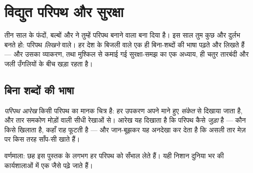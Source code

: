 \chapter{विद्युत परिपथ और सुरक्षा}\label{ch:g6:circuits-and-safety}

तीन साल के फंदों, बल्बों और  ने तुम्हें परिपथ बनाने वाला बना
दिया है। इस साल तुम कुछ और दुर्लभ बनते हो: परिपथ \emph{लिखने} वाले।
हर देश के बिजली वाले एक ही बिना-शब्दों की भाषा पढ़ते और लिखते हैं ---
और उसका व्याकरण, तथा मुश्किल से कमाई गई सुरक्षा-समझ का एक अध्याय, ही
चतुर तारबंदी और जली उँगलियों के बीच खड़ा रहता है।

\section{बिना शब्दों की भाषा}

\begin{definition}[परिपथ आरेख]\label{def:g6:circuits-and-safety:diagram}
\emph{परिपथ आरेख} किसी परिपथ का मानक चित्र है: हर
उपकरण अपने माने हुए \emph{संकेत} से दिखाया जाता है, और
तार समकोण मोड़ों वाली सीधी रेखाओं से। आरेख यह दिखाता है कि परिपथ
कैसे \emph{जुड़ा} है --- कौन किसे खिलाता है, कहाँ राह फूटती है ---
और जान-बूझकर यह अनदेखा कर देता है कि असली तार मेज़ पर किस तरह
साँप-सी  खाते हैं।
\end{definition}

\begin{omfigure}

{\small वर्णमाला: छह  इस पुस्तक के लगभग हर परिपथ को सँभाल लेते
हैं। यही निशान दुनिया भर की कार्यशालाओं में एक जैसे पढ़े जाते हैं।}
\end{omfigure}

